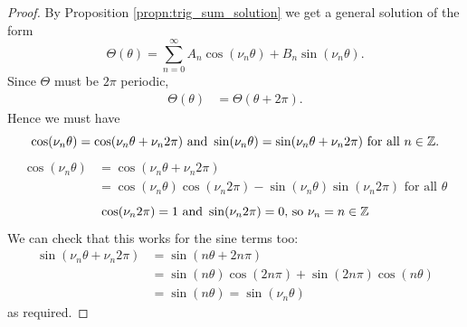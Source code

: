   \begin{proof} By Proposition \ref{propn:trig_sum_solution} we get a general solution of the form
      \begin{equation}
          \Theta(\theta) = \sum^\infty_{n=0} A_n \cos(\nu_n \theta) + B_n \sin(\nu_n \theta).
      \end{equation}
  Since $\Theta$ must be $2\pi$ periodic,
      \begin{align*}
          \Theta(\theta) &= \Theta(\theta + 2\pi).
      \end{align*}
  Hence we must have
      \begin{equation*}
          \cos(\nu_n \theta) = \cos(\nu_n \theta + \nu_n 2 \pi)
          ~\text{and}~
          \sin(\nu_n \theta) = \sin(\nu_n \theta + \nu_n 2 \pi)
          ~\text{for all}~ n \in \mathbb{Z}.
      \end{equation*}
      \begin{align*}
          \cos(\nu_n \theta) &= \cos(\nu_n \theta + \nu_n 2 \pi)\\
          &= \cos(\nu_n \theta) \cos(\nu_n 2 \pi) - \sin(\nu_n \theta) \sin(\nu_n 2 \pi) \text{ for all }\theta
      \end{align*}
      \begin{equation*}
          \cos(\nu_n 2 \pi) = 1
          \text{ and }
          \sin (\nu_n 2 \pi) = 0 \text{, so } \nu_n = n \in \mathbb{Z}
      \end{equation*}
  We can check that this works for the sine terms too:
      \begin{align*}
          \sin(\nu_n \theta + \nu_n 2\pi)
          &= \sin(n \theta + 2n \pi)\\
          &= \sin(n \theta) \cos(2n\pi) + \sin(2n\pi)\cos(n\theta)\\
          &= \sin(n\theta) = \sin(\nu_n \theta)
      \end{align*}
  as required.
  \end{proof}\par
%

